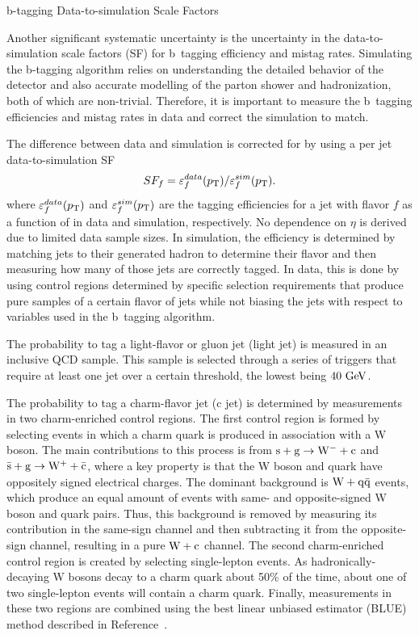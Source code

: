 \begin{section}{b-tagging Data-to-simulation Scale Factors}
\label{sec:btag_sfs}

Another significant systematic uncertainty is the uncertainty in the data-to-simulation scale factors (SF) for b~tagging efficiency and mistag rates.
Simulating the b-tagging algorithm relies on understanding the detailed behavior of the detector and also accurate modelling of the parton shower and hadronization, both of which are non-trivial.
Therefore, it is important to measure the b~tagging efficiencies and mistag rates in data and correct the simulation to match.

The difference between data and simulation is corrected for by using a per jet data-to-simulation SF
\begin{align}
SF_{f} = \varepsilon^{data}_{f}(p_{\mathrm{T}})/\varepsilon^{sim}_{f}(p_{\mathrm{T}}).
\end{align}
where $\varepsilon^{data}_{f}(p_{\mathrm{T}})$ and $\varepsilon^{sim}_{f}(p_{\mathrm{T}})$ are the tagging efficiencies for a jet with flavor $f$ as a function of \pT in data and simulation, respectively.
No dependence on $\eta$ is derived due to limited data sample sizes.
In simulation, the efficiency is determined by matching jets to their generated hadron to determine their flavor and then measuring how many of those jets are correctly tagged.
In data, this is done by using control regions determined by specific selection requirements that produce pure samples of a certain flavor of jets while not biasing the jets with respect to variables used in the b~tagging algorithm.

The probability to tag a light-flavor or gluon jet (light jet) is measured in an inclusive QCD sample.
This sample is selected through a series of triggers that require at least one jet over a certain \pT threshold, the lowest being $40~\mathrm{Ge\kern -0.1em V}$.

The probability to tag a charm-flavor jet (c jet) is determined by measurements in two charm-enriched control regions.
The first control region is formed by selecting events in which a charm quark is produced in association with a W boson.
The main contributions to this process is from $\mathrm{s} + \mathrm{g} \to \mathrm{W^{-}} + \mathrm{c}$ and $\mathrm{\bar{s}} + \mathrm{g} \to \mathrm{W^{+}} + \mathrm{\bar{c}}$, where a key property is that the W boson and quark have oppositely signed electrical charges.
The dominant background is $\mathrm{W} + \mathrm{q\bar{q}}$ events, which produce an equal amount of events with same- and opposite-signed W boson and quark pairs.
Thus, this background is removed by measuring its contribution in the same-sign channel and then subtracting it from the opposite-sign channel, resulting in a pure $\mathrm{W} + \mathrm{c}$ channel.
The second charm-enriched control region is created by selecting single-lepton \ttbar events.
As hadronically-decaying W bosons decay to a charm quark about 50\% of the time, about one of two single-lepton \ttbar events will contain a charm quark.
Finally, measurements in these two regions are combined using the best linear unbiased estimator (BLUE) method described in Reference~\cite{LYONS1988110}.


\end{section}
